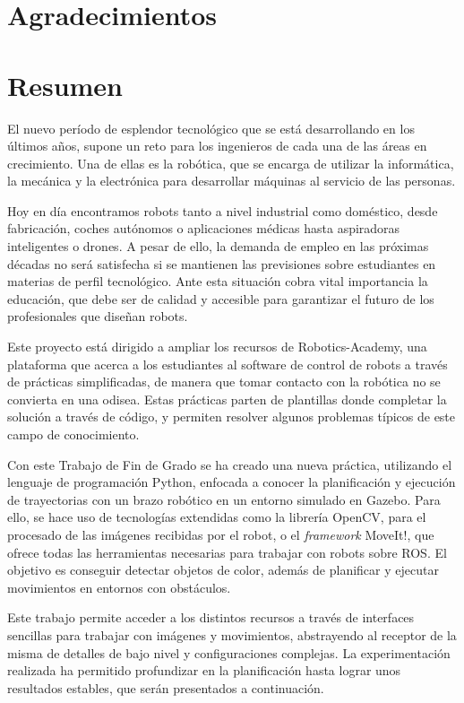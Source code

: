 \documentclass[12pt,spanish,chapterprefix, numbers=noenddot]{book}
\numberwithin{equation}{section}
\numberwithin{figure}{section}
\begin{document}
\chapter*{Agradecimientos}

\chapter*{Resumen}
El nuevo período de esplendor tecnológico que se está desarrollando en los últimos años, supone un reto para los ingenieros de cada una de las áreas en crecimiento. Una de ellas es la robótica, que se encarga de utilizar la informática, la mecánica y la electrónica para desarrollar máquinas al servicio de las personas. 

Hoy en día encontramos robots tanto a nivel industrial como doméstico, desde fabricación, coches autónomos o aplicaciones médicas hasta aspiradoras inteligentes o drones. A pesar de ello, la demanda de empleo en las próximas décadas no será satisfecha si se mantienen las previsiones sobre estudiantes en materias de perfil tecnológico. Ante esta situación cobra vital importancia la educación, que debe ser de calidad y accesible para garantizar el futuro de los profesionales que diseñan robots. 

Este proyecto está dirigido a ampliar los recursos de Robotics-Academy, una plataforma que acerca a los estudiantes al software de control de robots a través de prácticas simplificadas, de manera que tomar contacto con la robótica no se convierta en una odisea. Estas prácticas parten de plantillas donde completar la solución a través de código, y permiten resolver algunos problemas típicos de este campo de conocimiento. 

Con este Trabajo de Fin de Grado se ha creado una nueva práctica, utilizando el lenguaje de programación Python, enfocada a conocer la planificación y ejecución de trayectorias con un brazo robótico en un entorno simulado en Gazebo. Para ello, se hace uso de tecnologías extendidas como la librería OpenCV, para el procesado de las imágenes recibidas por el robot, o el \textit{framework} MoveIt!, que ofrece todas las herramientas necesarias para trabajar con robots sobre ROS. El objetivo es conseguir detectar objetos de color, además de planificar y ejecutar movimientos en entornos con obstáculos. 

Este trabajo permite acceder a los distintos recursos a través de interfaces sencillas para trabajar con imágenes y movimientos, abstrayendo al receptor de la misma de detalles de bajo nivel y configuraciones complejas. La experimentación realizada ha permitido profundizar en la planificación hasta lograr unos resultados estables, que serán presentados a continuación.  
\end{document}

